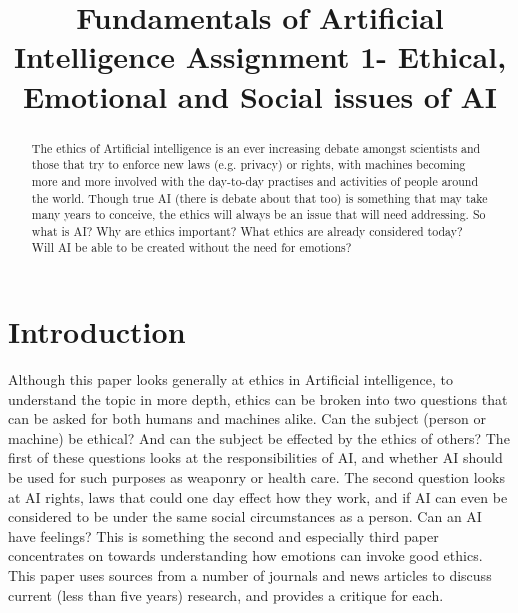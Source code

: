 \documentclass[article]{IEEEtran}
\begin{document}
\title{Fundamentals of Artificial Intelligence Assignment 1- Ethical, Emotional and Social issues of AI}

\author{
}

\maketitle

\begin{abstract}
The ethics of Artificial intelligence is an ever increasing debate amongst scientists and those that try to enforce new laws (e.g. privacy) or rights, with machines becoming more and more involved with the day-to-day practises and activities of people around the world. Though true AI (there is debate about that too) is something that may take many years to conceive, the ethics will always be an issue that will need addressing. So what is AI? Why are ethics important? What ethics are already considered today? Will AI be able to be created without the need for emotions?
\end{abstract}

\section{Introduction}
Although this paper looks generally at ethics in Artificial intelligence, to understand the topic in more depth, ethics can be broken into two questions that can be asked for both humans and machines alike. Can the subject (person or machine) be ethical? And can the subject be effected by the ethics of others? The first of these questions looks at the responsibilities of AI, and whether AI should be used for such purposes as weaponry or health care. The second question looks at AI rights, laws that could one day effect how they work, and if AI can even be considered to be under the same social circumstances as a person. Can an AI have feelings? This is something the second and especially third paper concentrates on towards understanding how emotions can invoke good ethics. This paper uses sources from a number of journals and news articles to discuss current (less than five years) research, and provides a critique for each.
\end{document}
